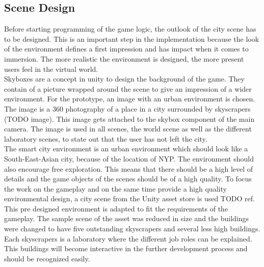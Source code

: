 \subsection{Scene Design}
Before starting programming of the game logic, the outlook of the city scene has to be designed. This is an important step in the implementation because the look of the environment defines a first impression and has impact when it comes to immersion. The more realistic the environment is designed, the more present users feel in the virtual world.\\
Skyboxes are a concept in unity to design the background of the game. They contain of a picture wrapped around the scene to give an impression of a wider environment. \cite{?}
For the prototype, an image with an urban environment is chosen. The image is a 360 photography of a place in a city surrounded by skyscrapers (TODO image). This image gets attached to the skybox component of the main camera. The image is used in all scenes, the world scene as well as the different laboratory scenes, to state out that the user has not left the city. \\
The smart city environment is an urban environment which should look like a South-East-Asian city, because of the location of NYP. The environment should also encourage free exploration. This means that there should be a high level of details and the game objects of the scenes should be of a high quality. To focus the work on the gameplay and on the same time provide a high quality environmental design, a city scene from the Unity asset store is used TODO ref. This pre designed environment is adapted to fit the requirements of the gameplay. The sample scene of the asset was reduced in size and the buildings were changed to have five outstanding skyscrapers and several less high buildings. Each skyscrapers is a laboratory where the different job roles can be explained. This buildings will become interactive in the further development process and should be recognized easily.
